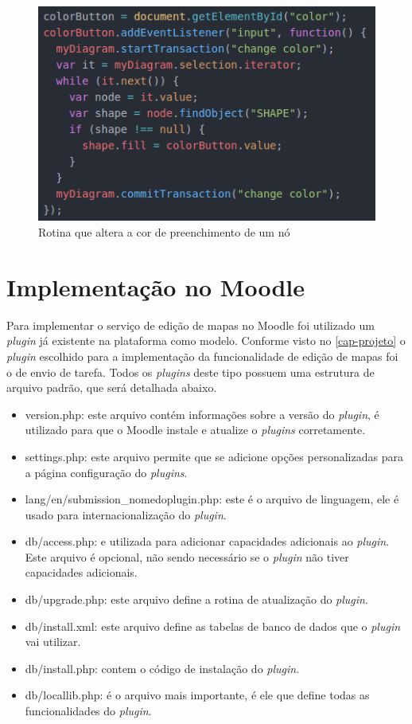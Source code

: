\documentclass[
	12pt,				%
	openright,			%
	oneside,			%
	a4paper,			%
	english,			%
	french,				%
	spanish,			%
	brazil				%
	]{abntex2}
\begin{document}
\begin{figure}[htb]
	\caption{\label{fig_listener} Rotina que altera a cor de preenchimento de um nó}
	\begin{center}
		\includegraphics[scale=0.6]{listener.png}
	\end{center}
\end{figure}

\section{Implementação no Moodle} 
Para implementar o serviço de edição de mapas no Moodle foi utilizado um \textit{plugin} já existente na plataforma como modelo. Conforme visto no \autoref{cap-projeto} o \textit{plugin} escolhido para a implementação da funcionalidade de edição de mapas foi o de envio de tarefa. Todos os \textit{plugins} deste tipo possuem uma estrutura de arquivo padrão, que será detalhada abaixo.
\begin{itemize}
	\item version.php: este arquivo contém informações sobre a versão do \textit{plugin}, é utilizado para que o Moodle instale e atualize o \textit{plugins} corretamente.
	\item settings.php: este arquivo permite que se adicione opções personalizadas para a página configuração do \textit{plugins}.
	\item lang/en/submission\_nomedoplugin.php:  este é o arquivo de linguagem, ele é usado para internacionalização do \textit{plugin}.
	\item db/access.php: e utilizada para adicionar capacidades adicionais ao \textit{plugin}. Este arquivo é opcional, não sendo necessário se o \textit{plugin} não tiver capacidades adicionais.
	\item db/upgrade.php: este arquivo define a rotina de atualização do \textit{plugin}. 
	\item db/install.xml: este arquivo define as tabelas de banco de dados que o \textit{plugin} vai utilizar. 
	\item db/install.php: contem o código de instalação do \textit{plugin}.
	\item db/locallib.php: é o arquivo mais importante, é ele que define todas as funcionalidades do \textit{plugin}.    
\end{itemize} 
\end{document}
